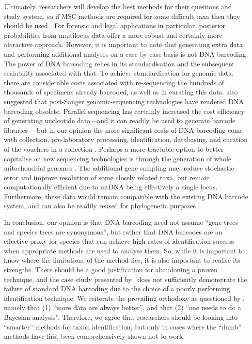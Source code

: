 \documentclass[12pt]{article}
\begin{document}
Ultimately, researchers will develop the best methods for their questions and study system, so if MSC methods are required for some difficult taxa then they should be used \citep{Dupuis2012}. For forensic and legal applications in particular, posterior probabilities from multilocus data offer a more robust and certainly more attractive approach. However, it is important to note that generating extra data and performing additional analyses on a case-by-case basis is not DNA barcoding. The power of DNA barcoding relies in its standardisation and the subsequent scalability associated with that. To achieve standardisation for genomic data, there are considerable costs associated with re-sequencing the hundreds of thousands of specimens already barcoded, as well as in curating this data. \citet{Taylor2012} also suggested that post-Sanger genomic-sequencing technologies have rendered DNA barcoding obsolete. Parallel sequencing has certainly increased the cost efficiency of generating nucleotide data---and it can readily be used to generate barcode libraries \citep{Shokralla2014}---but in our opinion the more significant costs of DNA barcoding come with collection, pre-laboratory processing, identification, databasing, and curation of the vouchers in a collection \citep{Gregory2005,Borisenko2009,Puillandre2012a}. Perhaps a more tractable option to better capitalise on new sequencing technologies is through the generation of whole mitochondrial genomes \citep[see][]{Gillett2014}. The additional gene sampling may reduce stochastic error and improve resolution of some closely related taxa, but remain computationally efficient due to mtDNA being effectively a single locus. Furthermore, these data would remain compatible with the existing DNA barcode system, and can also be readily reused for phylogenetic purposes \citep{Gillett2014}.

In conclusion, our opinion is that DNA barcoding need not assume ``gene trees and species trees are synonymous'', but rather that DNA barcodes are an effective proxy for species that can achieve high rates of identification success when appropriate methods are used to analyse them. So, while it is important to know where the limitations of the method lies, it is also important to realise its strengths. There should be a good justification for abandoning a proven technique, and the case study presented by \citeauthor{Dowton2014}\ does not sufficiently demonstrate the failure of standard DNA barcoding due to the choice of a poorly performing identification technique.  We reiterate the prevailing orthodoxy as questioned by \citet{Karl2012}, namely that (1) ``more data are always better'', and that (2) ``one needs to do a Bayesian analysis''. Therefore, we agree that researchers should be looking into ``smarter'' methods for taxon identification, but only in cases where the ``dumb'' methods have first been comprehensively shown not to work.
\end{document}
